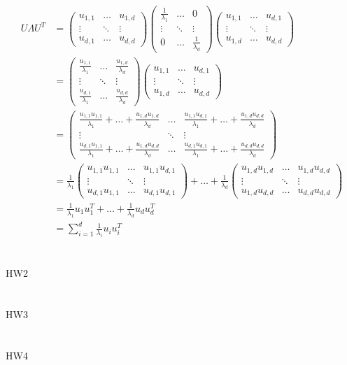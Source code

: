 \documentclass[11pt]{article}
\newcommand{\exercise}{\section{}}
\begin{document}
\begin{align}
	U\Lambda U^{T} &= 
		\begin{pmatrix}
		u_{1,1} & \dots & u_{1,d} \\
		\vdots & \ddots & \vdots \\
		u_{d,1} & \dots & u_{d,d}
		\end{pmatrix}
		\begin{pmatrix}
		\frac{1}{\lambda_1} & \dots & 0 \\
		\vdots & \ddots & \vdots \\
		0 & \dots & \frac{1}{\lambda_d}
		\end{pmatrix}
		\begin{pmatrix}
		u_{1,1} & \dots & u_{d,1} \\
		\vdots & \ddots & \vdots \\
		u_{1,d} & \dots & u_{d,d}
		\end{pmatrix} 
		\\
		&= 
		\begin{pmatrix}
		\frac{u_{1,1}}{\lambda_1} & \dots & \frac{u_{1,d}}{\lambda_d} \\
		\vdots & \ddots & \vdots \\
		\frac{u_{d,1}}{\lambda_1} & \dots & \frac{u_{d,d}}{\lambda_d}
		\end{pmatrix}
		\begin{pmatrix}
		u_{1,1} & \dots & u_{d,1} \\
		\vdots & \ddots & \vdots \\
		u_{1,d} & \dots & u_{d,d}
		\end{pmatrix}
		\\
		&=
		\begin{pmatrix}
		\frac{u_{1,1}u_{1,1}}{\lambda_1}+\dots+\frac{u_{1,d}u_{1,d}}{\lambda_d} & \dots & \frac{u_{1,1}u_{d,1}}{\lambda_1} + \dots + \frac{u_{1,d}u_{d,d}}{\lambda_d} \\
		\vdots & \ddots & \vdots \\
		\frac{u_{d,1}u_{1,1}}{\lambda_1} + \dots + \frac{u_{1,d}u_{d,d}}{\lambda_d} & \dots & \frac{u_{d,1}u_{d,1}}{\lambda_1} + \dots + \frac{u_{d,d}u_{d,d}}{\lambda_d}
		\end{pmatrix}
		\\
		&=
		\frac{1}{\lambda_1}
		\begin{pmatrix}
		u_{1,1}u_{1,1} & \dots & u_{1,1}u_{d,1} \\
		\vdots & \ddots & \vdots \\
		u_{d,1}u_{1,1} & \dots & u_{d,1}u_{d,1}
		\end{pmatrix}
		+ \dots +
		\frac{1}{\lambda_d}
		\begin{pmatrix}
		u_{1,d}u_{1,d} & \dots & u_{1,d}u_{d,d} \\
		\vdots & \ddots & \vdots \\
		u_{1,d}u_{d,d} & \dots & u_{d,d}u_{d,d}
		\end{pmatrix}
		\\
		&=
		\frac{1}{\lambda_1}u_1u_1^{T} + \dots + \frac{1}{\lambda_d}u_du_d^{T} \\
		&= \sum_{i=1}^{d} \frac{1}{\lambda_i}u_iu_i^T
\end{align}

\exercise
HW2

\exercise
HW3

\exercise
HW4
\end{document}
